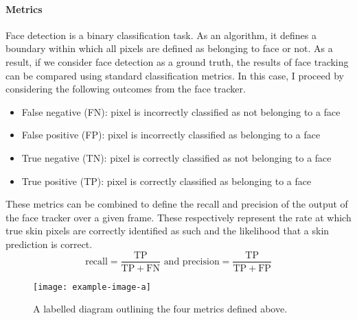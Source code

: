 \paragraph{Metrics}
Face detection is a binary classification task. As an algorithm, it defines a boundary within which all pixels are defined as belonging to face or not.
As a result, if we consider face detection as a ground truth, the results of face tracking can be compared using standard classification metrics. In this case, I proceed by considering the following outcomes from the face tracker.
\begin{itemize}
   \item False negative (FN): pixel is incorrectly classified as not belonging to a face
   \item False positive (FP): pixel is incorrectly classified as belonging to a face
   \item True negative (TN): pixel is correctly classified as not belonging to a face 
   \item True positive (TP): pixel is correctly classified as belonging to a face 
\end{itemize}
These metrics can be combined to define the recall and precision of the output of the face tracker over a given frame. These respectively represent the rate at which true skin pixels are correctly identified as such and the likelihood that a skin prediction is correct.
\begin{equation*}
    \mathrm{recall} = \frac{\mathrm{TP}}{\mathrm{TP} + \mathrm{FN}} \text{ and } \mathrm{precision} = \frac{\mathrm{TP}}{\mathrm{TP}+\mathrm{FP}}
\end{equation*}
\begin{figure}[H]
    \centering
    \texttt{[image: example-image-a]}
   \caption{A labelled diagram outlining the four metrics defined above.} 
\end{figure}
\noindent
